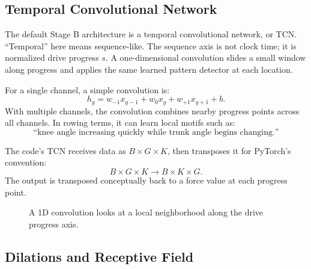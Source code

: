 \documentclass[11pt]{article}
\newcommand{\code}[1]{\texttt{\detokenize{#1}}}
\begin{document}
\subsection{Temporal Convolutional Network}

The default Stage B architecture is a temporal convolutional network, or TCN.
``Temporal'' here means sequence-like. The sequence axis is not clock time; it
is normalized drive progress \(s\). A one-dimensional convolution slides a
small window along progress and applies the same learned pattern detector at
each location.

For a single channel, a simple convolution is:
\[
  h_g
  =
  w_{-1}x_{g-1}+w_0x_g+w_{+1}x_{g+1}+b.
\]
With multiple channels, the convolution combines nearby progress points across
all channels. In rowing terms, it can learn local motifs such as:
\[
  \text{``knee angle increasing quickly while trunk angle begins changing.''}
\]

The code's TCN receives data as \(B \times G \times K\), then transposes it for
PyTorch's \code{Conv1d} convention:
\[
  B \times G \times K
  \rightarrow
  B \times K \times G.
\]
The output is transposed conceptually back to a force value at each progress
point.

\begin{figure}[H]
  \centering
  \caption{A 1D convolution looks at a local neighborhood along the drive
  progress axis.}
  \label{fig:stageb-convolution-window}
\end{figure}

\subsection{Dilations and Receptive Field}
\end{document}
